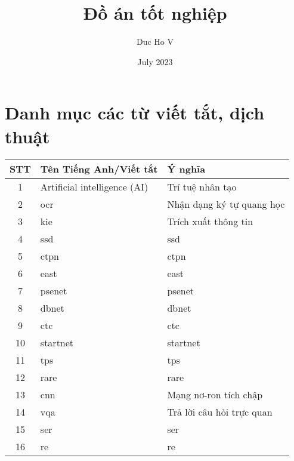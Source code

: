 \documentclass[a4paper]{report}
\title{\Huge Đồ án tốt nghiệp}
\author{Duc Ho V}
\date{July 2023}
\begin{document}

\newpage
{}
\tableofcontents

\newpage
{}
\listoffigures

\newpage
{}
\listoftables

\newpage
\section*{\Large\selectfont Danh mục các từ viết tắt, dịch thuật}

\begin{center}
  \begin{tabular}{| c | m{6.5cm} | m{6.0cm} |}
  \hline
  \textbf{STT} & \textbf{Tên Tiếng Anh/Viết tắt} & \textbf{Ý nghĩa} \\ 
  \hline
  1 & Artificial intelligence (AI) & Trí tuệ nhân tạo \\ 
  \hline
  2 & \acrfull*{ocr}  & Nhận dạng ký tự quang học \\ 
  \hline
  3 & \acrfull*{kie} & Trích xuất thông tin \\ 
  \hline
  4 & \acrshort*{ssd} & \acrlong*{ssd} \\ 
  \hline
  5 & \acrshort*{ctpn} & \acrlong*{ctpn} \\ 
  \hline
  6 & \acrshort*{east} & \acrlong*{east} \\ 
  \hline
  7 & \acrshort*{psenet} & \acrlong*{psenet} \\ 
  \hline
  8 & \acrshort*{dbnet} & \acrlong*{dbnet} \\ 
  \hline
  9 & \acrshort*{ctc} & \acrlong*{ctc} \\ 
  \hline
  10 & \acrshort*{startnet} & \acrlong*{startnet} \\ 
  \hline
  11 & \acrshort*{tps} & \acrlong*{tps} \\ 
  \hline
  12 & \acrshort*{rare} & \acrlong*{rare} \\ 
  \hline
  13 & \acrfull*{cnn} & Mạng nơ-ron tích chập \\ 
  \hline
  14 & \acrfull*{vqa} & Trả lời câu hỏi trực quan \\ 
  \hline
  15 & \acrshort*{ser} & \acrlong*{ser} \\ 
  \hline
  16 & \acrshort*{re} & \acrlong*{re} \\ 
  \hline
\end{tabular}
\end{center}
\end{document}
